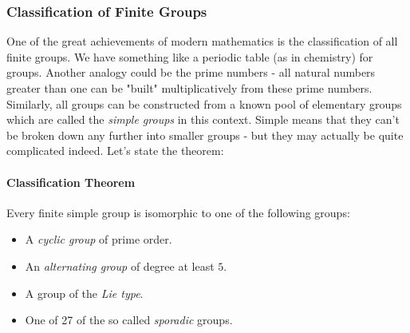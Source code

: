 


\subsubsection{Classification of Finite Groups}
One of the great achievements of modern mathematics is the classification of all finite groups. We have something like a periodic table (as in chemistry) for groups. Another analogy could be the prime numbers - all natural numbers greater than one can be "built" multiplicatively from these prime numbers. Similarly, all groups can be constructed from a known pool of elementary groups which are called the \emph{simple groups} in this context. Simple means that they can't be broken down any further into smaller groups - but they may actually be quite complicated indeed. Let's state the theorem:

\paragraph{Classification Theorem}
Every finite simple group is isomorphic to one of the following groups:
\begin{itemize}
\item A \emph{cyclic group} of prime order.
\item An \emph{alternating group} of degree at least $5$.
\item A group of the \emph{Lie type}.
\item One of 27 of the so called \emph{sporadic} groups.
\end{itemize}

